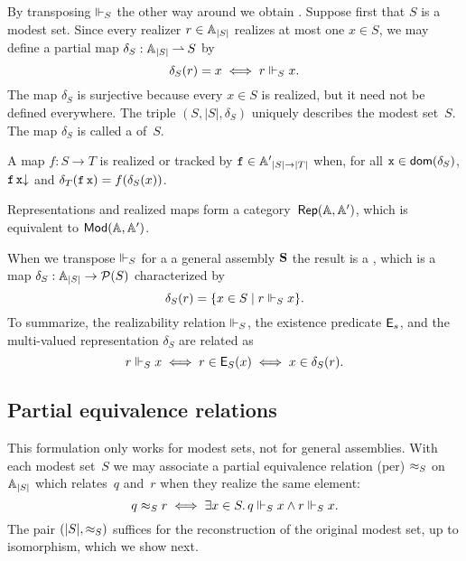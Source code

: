 By transposing $\Vdash_S$ the other way around we obtain . Suppose first that $S$ is a modest set. Since every realizer $r \in {\mathbb{A}}_{|S|}$ realizes at most one $x \in S$, we may define a partial map $\delta_S : {\mathbb{A}}_{|S|} \mathbin{\rightharpoonup} S$ by
%
\begin{equation*}
  \delta_S(r) = x \iff r \Vdash_S x.
\end{equation*}
%
The map $\delta_S$ is surjective because every $x \in S$ is realized, but it need not be defined everywhere. The triple $(S, |S|, \delta_S)$ uniquely describes the modest set~$S$. The map $\delta_S$ is called a  of~$S$.

A map $f : S \to T$ is realized or tracked by $\mathtt{f} \in {\mathbb{A}'}_{|S| \to |T|}$ when, for all $\mathtt{x} \in \mathsf{dom}(\delta_S)$, $\mathtt{f}\,\mathtt{x}{\downarrow}$ and $\delta_T(\mathtt{f}\,\mathtt{x}) = f(\delta_S(x))$.

Representations and realized maps form a category~$\mathsf{Rep}(\mathbb{A},\mathbb{A}')$, which is equivalent to $\mathsf{Mod}(\mathbb{A}, \mathbb{A}')$.

When we transpose $\Vdash_S$ for a a general assembly $\mathbf{S}$ the result is a , which is a map $\delta_S : {\mathbb{A}}_{|S|} \to \mathcal{P}(S)$ characterized by
%
\begin{equation*}
  \delta_S(r) = \{ x \in S \mid r \Vdash_S x\}.
\end{equation*}
%
To summarize, the realizability relation $\Vdash_S$, the existence predicate $\mathsf{E}_s$, and the multi-valued representation $\delta_S$ are related as
%
\begin{equation*}
  r \Vdash_S x \iff
  r \in \mathsf{E}_S(x) \iff
  x \in \delta_S(r).
\end{equation*}


\subsection{Partial equivalence relations}
\label{sec:pers}

This formulation only works for modest sets, not for general
assemblies. With each modest set~$S$ we may associate a partial
equivalence relation (per) $\approx_S$ on
${\mathbb{A}}_{|S|}$ which relates~$q$ and~$r$ when they realize the same
element:
%
\begin{equation*}
  q \approx_S r \iff
  \exists x \in S .\, q \Vdash_S x \land r \Vdash_S x.
\end{equation*}
%
The pair $(|S|, {\approx_S})$ suffices for the reconstruction of the
original modest set, up to isomorphism, which we show next.

